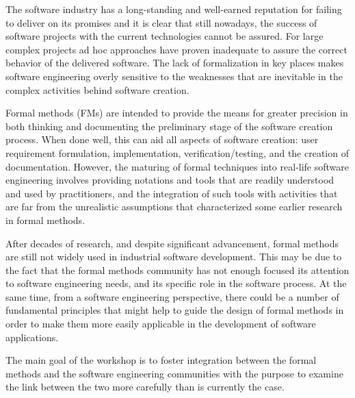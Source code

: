 The software industry has a long-standing and well-earned reputation for
failing to deliver on its promises and it is clear that still nowadays, the
success of software projects with the current technologies cannot be assured.
For large complex projects ad hoc approaches have proven inadequate to assure
the correct behavior of the delivered software. The lack of formalization in
key places makes software engineering overly sensitive to the weaknesses that
are inevitable in the complex activities behind software creation. 

Formal methods (FMs) are intended to provide the means for greater precision in
both thinking and documenting the preliminary stage of the software creation
process. When done well, this can aid all aspects of software creation: user
requirement formulation, implementation, verification/testing, and the creation
of documentation. However, the maturing of formal techniques into real-life
software engineering involves providing notations and tools that are readily
understood and used by practitioners, and the integration of such tools with
activities that are far from the unrealistic assumptions that characterized
some earlier research in formal methods.

After decades of research, and despite significant advancement, formal methods
are still not widely used in industrial software development. This may be due
to the fact that the formal methods community has not enough focused its
attention to software engineering needs, and its specific role in the software
process. At the same time, from a software engineering perspective, there could
be a number of fundamental principles that might help to guide the design of
formal methods in order to make them more easily applicable in the development
of software applications.

The main goal of the workshop is to foster integration between the formal
methods and the software engineering communities with the purpose to examine
the link between the two more carefully than is currently the case.

